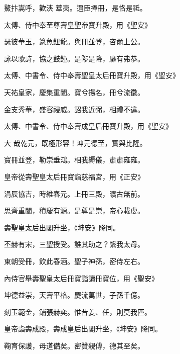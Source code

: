 \begin{pinyinscope}
 鰲抃嵩呼，歡浹
 華夷。邇臣捧冊，是恪是祗。



 太傅、侍中奉至尊壽皇聖帝寶升殿，用《聖安》



 瑟彼華玉，篆魚鈕龍。與冊並登，咨爾上公。



 詠以歌詩，協之鼓鐘。是陟是降，靡有弗恭。



 太傅、中書令、侍中奉壽聖皇太后冊寶升殿，用《聖安》



 天祐皇家，慶集重闈。寶兮揚名，冊兮流徽。



 金支秀華，盛容祲威。詔我近弼，相禮不違。



 太傅、中書令、侍中奉壽成皇后冊寶升殿，用《聖安》



 大
 哉乾元，既極形容！坤元德至，實與比隆。



 寶冊並登，勒崇垂鴻。相我縟儀，肅肅雍雍。



 皇帝從壽聖皇太后冊寶詣慈福宮，用《正安》



 涓辰協吉，時維春元。上冊三殿，曠古無前。



 思齊重闈，積慶有源。是尊是崇，帝心載虔。



 壽聖皇太后出閣升坐，《坤安》降同。



 丕赫有宋，三聖授受。誰其助之？繄我太母。



 東朝受冊，飲此春酒。聖子神孫，密侍左右。



 內侍官舉壽聖皇太后冊寶詣讀冊寶位，用《聖安》



 坤德益崇，天壽平格。慶流萬世，子孫千億。



 刻玉範金，鋪張赫奕。惟昔姜、任，則莫我匹。



 皇帝詣壽成殿，壽成皇后出閣升坐，《坤安》降同。



 鞠育保護，母道備矣。密贊親傅，德其至矣。




\end{pinyinscope}
